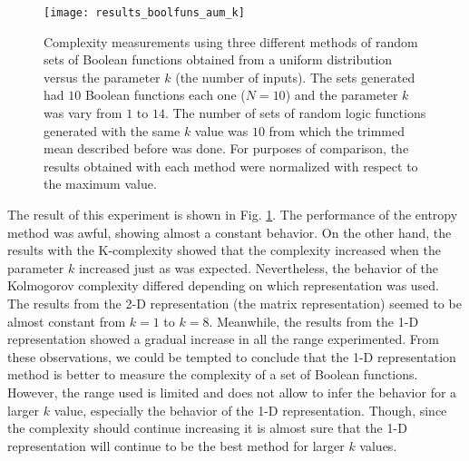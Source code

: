 \begin{figure}
\centering
\texttt{[image: results\_boolfuns\_aum\_k]}
\caption[Complexity measurements using three different methods of random sets of Boolean functions.]{Complexity measurements using three different methods of random sets of Boolean functions obtained from a uniform distribution versus the parameter $k$ (the number of inputs). The sets generated had $10$ Boolean functions each one ($N=10$) and the parameter $k$ was vary from $1$ to $14$. The number of sets of random logic functions generated with the same $k$ value was $10$ from which the trimmed mean described before was done. For purposes of comparison, the results obtained with each method were normalized with respect to the maximum value.}
\label{fig:results_boolfuns_aum_k}
\end{figure}

The result of this experiment is shown in Fig. \ref{fig:results_boolfuns_aum_k}. The performance of the entropy method was awful, showing almost a constant behavior. On the other hand, the results with the K-complexity showed that the complexity increased when the parameter $k$ increased just as was expected. Nevertheless, the behavior of the Kolmogorov complexity differed depending on which representation was used. The results from the 2-D representation (the matrix representation) seemed to be almost constant from $k=1$ to $k=8$. Meanwhile, the results from the 1-D representation showed a gradual increase in all the range experimented. From these observations, we could be tempted to conclude that the 1-D representation method is better to measure the complexity of a set of Boolean functions. However, the range used is limited and does not allow to infer the behavior for a larger $k$ value, especially the behavior of the 1-D representation. Though, since the complexity should continue increasing it is almost sure that the 1-D representation will continue to be the best method for larger $k$ values.\\


